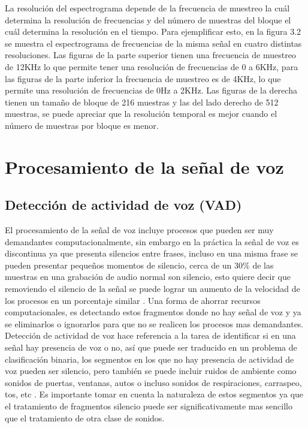 La resoluci\'on del espectrograma depende de la frecuencia de muestreo la cu\'al determina la resoluci\'on de frecuencias y del n\'umero de muestras del bloque el cu\'al determina la resoluci\'on en el tiempo. Para ejemplificar esto, en la figura 3.2 se muestra el espectrograma de frecuencias de la misma señal en cuatro distintas resoluciones. Las figuras de la parte superior tienen una frecuencia de muestreo de 12KHz lo que permite tener una resoluci\'on de frecuencias de 0 a 6KHz, para las figuras de la parte inferior la frecuencia de muestreo es de 4KHz, lo que permite una resoluci\'on de frecuencias de 0Hz a 2KHz. Las figuras de la derecha tienen un tamaño de bloque de 216 muestras y las del lado derecho de 512 muestras, se puede apreciar que la resoluci\'on temporal es mejor cuando el n\'umero de muestras por bloque es menor.\\


\section{Procesamiento de la señal de voz}
\subsection{Detecci\'on de actividad de voz (VAD)}
El procesamiento de la señal de voz incluye procesos que pueden ser muy demandantes computacionalmente, sin embargo en la pr\'actica la señal de voz es discontinua ya que presenta silencios entre frases, incluso en una misma frase se pueden presentar pequeños momentos de silencio, cerca de un 30$\%$ de las muestras en una grabaci\'on de audio normal son silencio, esto quiere decir que removiendo el silencio de la señal se puede lograr un aumento de la velocidad de los procesos en un porcentaje similar \cite{beigi2011}. Una forma de ahorrar recursos computacionales, es detectando estos fragmentos donde no hay señal de voz y ya se eliminarlos o ignorarlos para que no se realicen los procesos mas demandantes.\\

Detecci\'on de actividad de voz hace referencia a la tarea de identificar si en una señal hay presencia de voz o no, as\'i que puede ser traducido en un problema de clasificaci\'on binaria, los segmentos en los que no hay presencia de actividad de voz pueden ser silencio, pero tambi\'en se puede incluir ruidos de ambiente como sonidos de puertas, ventanas, autos o incluso sonidos de respiraciones, carraspeo, tos, etc \cite{gold}. Es importante tomar en cuenta la naturaleza de estos segmentos ya que el tratamiento de fragmentos silencio puede ser significativamente mas sencillo que el tratamiento de otra clase de sonidos.\\

